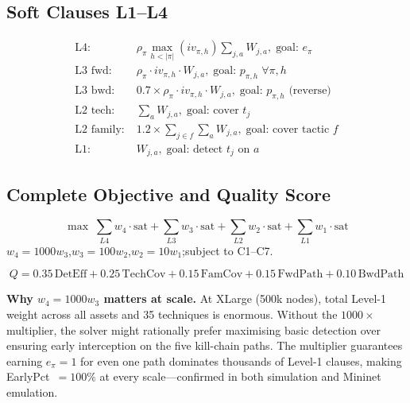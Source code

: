 \documentclass[journal]{IEEEtran}
\begin{document}
\subsection{Soft Clauses L1--L4}

\begin{align}
\text{L4:}&\;\rho_\pi\max_{h<|\pi|}(iv_{\pi,h})\sum_{j,a}W_{j,a},
  \;\text{goal: }e_\pi\label{eq:l4}\\
\text{L3 fwd:}&\;\rho_\pi\cdot iv_{\pi,h}\cdot W_{j,a},
  \;\text{goal: }p_{\pi,h}\;\forall\pi,h\label{eq:l3f}\\
\text{L3 bwd:}&\;0.7\times\rho_\pi\cdot iv_{\pi,h}\cdot W_{j,a},
  \;\text{goal: }p_{\pi,h}\text{ (reverse)}\label{eq:l3b}\\
\text{L2 tech:}&\;\textstyle\sum_a W_{j,a},
  \;\text{goal: cover }t_j\label{eq:l2t}\\
\text{L2 family:}&\;1.2\times\textstyle\sum_{j\in f}\sum_a W_{j,a},
  \;\text{goal: cover tactic }f\label{eq:l2f}\\
\text{L1:}&\;W_{j,a},\;\text{goal: detect }t_j\text{ on }a
  \label{eq:l1}
\end{align}

\subsection{Complete Objective and Quality Score}

\begin{equation}
\max\;\sum_{L4}w_4\cdot\text{sat}+\sum_{L3}w_3\cdot\text{sat}
  +\sum_{L2}w_2\cdot\text{sat}+\sum_{L1}w_1\cdot\text{sat}
\label{eq:obj}
\end{equation}
$w_4=1000w_3$,\;$w_3=100w_2$,\;$w_2=10w_1$;\;subject to C1--C7.

\begin{equation}
Q=0.35\,\text{DetEff}+0.25\,\text{TechCov}+0.15\,\text{FamCov}
  +0.15\,\text{FwdPath}+0.10\,\text{BwdPath}
\label{eq:Q}
\end{equation}

\begin{examplebox}
\textbf{Why $w_4=1000w_3$ matters at scale.}
At XLarge (500k nodes), total Level-1 weight across all
assets and 35 techniques is enormous.
Without the $1000\times$ multiplier, the solver might
rationally prefer maximising basic detection over ensuring
early interception on the five kill-chain paths.
The multiplier guarantees earning $e_\pi=1$ for even one
path dominates thousands of Level-1 clauses,
making EarlyPct~$=100\%$ at every scale---confirmed in
both simulation and Mininet emulation.
\end{examplebox}
\end{document}
